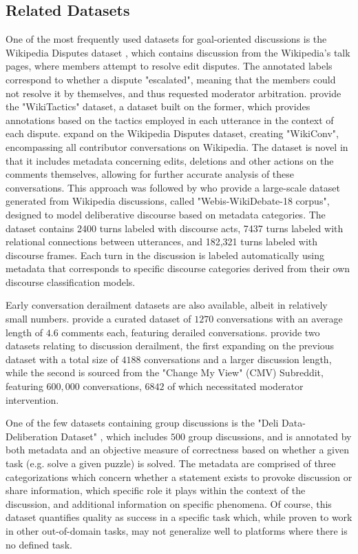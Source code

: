 \subsection{Related Datasets}
\label{sec:related:datasets}


One of the most frequently used datasets for goal-oriented discussions is the Wikipedia Disputes dataset \cite{de-kock-vlachos-2021-beg}, which contains discussion from the Wikipedia's talk pages, where members attempt to resolve edit disputes. The annotated labels correspond to whether a dispute "escalated", meaning that the members could not resolve it by themselves, and thus requested moderator arbitration. \citet{dekock2022disagree} provide the "WikiTactics" dataset, a dataset built on the former, which provides annotations based on the tactics employed in each utterance in the context of each dispute. \citet{hua2018wikiconvcorpuscompleteconversational} expand on the Wikipedia Disputes dataset, creating "WikiConv", encompassing all contributor conversations on Wikipedia. The dataset is novel in that it includes metadata concerning edits, deletions and other actions on the comments themselves, allowing for further accurate analysis of these conversations. This approach was followed by \citet{al-khatib-etal-2018-modeling} who provide a large-scale dataset generated from Wikipedia discussions, called "Webis-WikiDebate-18 corpus", designed to model deliberative discourse based on metadata categories. The dataset contains 2400 turns labeled with discourse acts, 7437 turns labeled with relational connections between utterances, and 182,321 turns labeled with discourse frames. Each turn in the discussion is labeled automatically using metadata that corresponds to specific discourse categories derived from their own discourse classification models.

Early conversation derailment datasets are also available, albeit in relatively small numbers. \citet{zhang-2018-gone-awry} provide a curated dataset of $1270$ conversations with an average length of $4.6$ comments each, featuring derailed conversations. \citet{chang-danescu-niculescu-mizil-2019-trouble} provide two datasets relating to discussion derailment, the first expanding on the previous dataset with a total size of $4188$ conversations and a larger discussion length, while the second is sourced from the "Change My View" (CMV) Subreddit, featuring $600,000$ conversations, $6842$ of which necessitated moderator intervention.

One of the few datasets containing group discussions is the "Deli Data-Deliberation Dataset" \cite{karadzhov2023delidata}, which includes $500$ group discussions, and is annotated by both metadata and an objective measure of correctness based on whether a given task (e.g. solve a given puzzle) is solved. The metadata are comprised of three categorizations which concern whether a statement exists to provoke discussion or share information, which specific role it plays within the context of the discussion, and additional information on specific phenomena. Of course, this dataset quantifies quality as success in a specific task which, while proven to work in other out-of-domain tasks, may not generalize well to platforms where there is no defined task.

